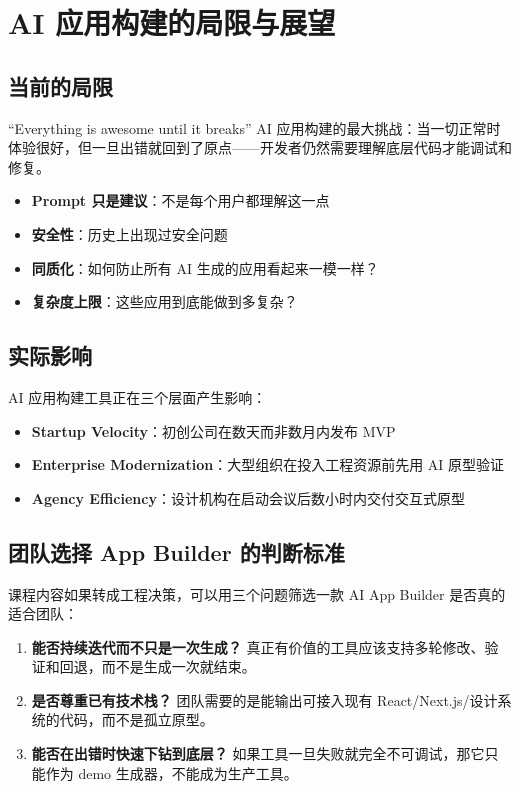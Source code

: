 \section{AI 应用构建的局限与展望}

\subsection{当前的局限}

\begin{warningbox}{``Everything is awesome until it breaks''}
AI 应用构建的最大挑战：当一切正常时体验很好，但一旦出错就回到了原点——开发者仍然需要理解底层代码才能调试和修复。
\end{warningbox}

\begin{itemize}
    \item \textbf{Prompt 只是建议}：不是每个用户都理解这一点
    \item \textbf{安全性}：历史上出现过安全问题
    \item \textbf{同质化}：如何防止所有 AI 生成的应用看起来一模一样？
    \item \textbf{复杂度上限}：这些应用到底能做到多复杂？
\end{itemize}

\subsection{实际影响}

AI 应用构建工具正在三个层面产生影响：

\begin{itemize}
    \item \textbf{Startup Velocity}：初创公司在数天而非数月内发布 MVP
    \item \textbf{Enterprise Modernization}：大型组织在投入工程资源前先用 AI 原型验证
    \item \textbf{Agency Efficiency}：设计机构在启动会议后数小时内交付交互式原型
\end{itemize}

\subsection{团队选择 App Builder 的判断标准}

课程内容如果转成工程决策，可以用三个问题筛选一款 AI App Builder 是否真的适合团队：

\begin{enumerate}
    \item \textbf{能否持续迭代而不只是一次生成？} 真正有价值的工具应该支持多轮修改、验证和回退，而不是生成一次就结束。
    \item \textbf{是否尊重已有技术栈？} 团队需要的是能输出可接入现有 React/Next.js/设计系统的代码，而不是孤立原型。
    \item \textbf{能否在出错时快速下钻到底层？} 如果工具一旦失败就完全不可调试，那它只能作为 demo 生成器，不能成为生产工具。
\end{enumerate}

